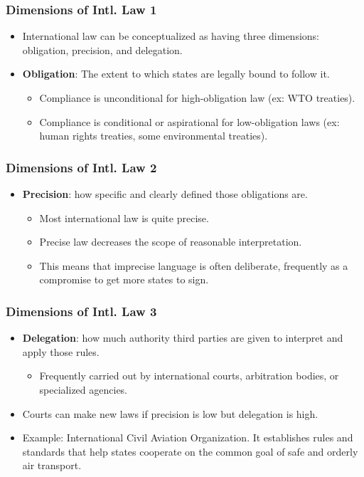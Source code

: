 \documentclass[handout]{beamer}
\begin{document}
\begin{frame} 
	\frametitle{\LARGE{Dimensions of Intl. Law 1}}
	\begin{itemize}
		\item International law can be conceptualized as having three dimensions: obligation, precision, and delegation. \pause
		\item \textbf{Obligation}: The extent to which states are legally bound to follow it. \pause
		\begin{itemize}
			\item Compliance is unconditional for high-obligation law (ex: WTO treaties).
			\item Compliance is conditional or aspirational for low-obligation laws (ex: human rights treaties, some environmental treaties).
		\end{itemize}
	\end{itemize}
\end{frame}

\begin{frame} 
	\frametitle{\LARGE{Dimensions of Intl. Law 2}}
	\begin{itemize}
		\item \textbf{Precision}: how specific and clearly defined those obligations are. \pause
		\begin{itemize}
			\item Most international law is quite precise. \pause
			\item Precise law decreases the scope of reasonable interpretation. \pause
			\item This means that imprecise language is often deliberate, frequently as a compromise to get more states to sign.
		\end{itemize}
	\end{itemize}
\end{frame}

\begin{frame} 
	\frametitle{\LARGE{Dimensions of Intl. Law 3}}
	\begin{itemize}
		\item \textbf{Delegation}: how much authority third parties are given to interpret and apply those rules. \pause
		\begin{itemize}
			\item Frequently carried out by international courts, arbitration bodies, or specialized agencies. \pause
		\end{itemize}
		\item Courts can make new laws if precision is low but delegation is high.
		\item Example: International Civil Aviation Organization. It establishes rules and standards that help states cooperate on the common goal of safe and orderly air transport.
	\end{itemize}
\end{frame}
\end{document}
